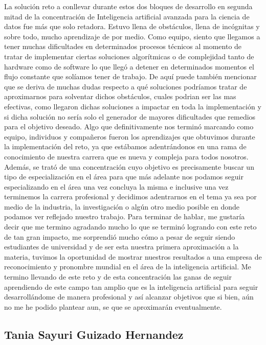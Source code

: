 \documentclass[runningheads]{llncs}
\begin{document}
La solución reto a conllevar durante estos dos bloques de desarrollo en segunda mitad de la concentración de Inteligencia artificial avanzada para la ciencia de datos fue más que solo retadora. Estuvo llena de obstáculos, llena de incógnitas y sobre todo, mucho aprendizaje de por medio. Como equipo, siento que llegamos a tener muchas dificultades en determinados procesos técnicos al momento de tratar de implementar ciertas soluciones algorítmicas o de complejidad tanto de hardware como de software lo que llegó a detener en determinados momentos el flujo constante que solíamos tener de trabajo. De aquí puede también mencionar que se deriva de muchas dudas respecto a qué soluciones podríamos tratar de aproximarnos para solventar dichos obstáculos, cuales podrian ser las mas efectivas, como llegaron dichas soluciones a impactar en toda la implementación y si dicha solución no sería solo el generador de mayores dificultades que remedios para el objetivo deseado. Algo que definitivamente nos terminó marcando como equipo, individuos y compañeros fueron los aprendizajes que obtuvimos durante la implementación del reto, ya que estábamos adentrándonos en una rama de conocimiento de nuestra carrera que es nueva y compleja para todos nosotros. Además, se trató de una concentración cuyo objetivo es precisamente buscar un tipo de especialización en el área para que más adelante nos podamos seguir especializando en el área una vez concluya la misma e inclusive una vez terminemos la carrera profesional y decidimos adentrarnos en el tema ya sea por medio de la industria, la investigación o algún otro medio posible en donde podamos ver reflejado nuestro trabajo. Para terminar de hablar, me gustaría decir que me termino agradando mucho lo que se terminó logrando con este reto de tan gran impacto, me sorprendió mucho cómo a pesar de seguir siendo estudiantes de universidad y de ser esta nuestra primera aproximación a la materia, tuvimos la oportunidad de mostrar nuestros resultados a una empresa de reconocimiento y pronombre mundial en el área de la inteligencia artificial. Me termino llevando de este reto y de esta concentración las ganas de seguir aprendiendo de este campo tan amplio que es la inteligencia artificial para seguir desarrollándome de manera profesional y así alcanzar objetivos que si bien, aún no me he podido plantear aun, se que se aproximarán eventualmente.


\subsection*{Tania Sayuri Guizado Hernandez}
\end{document}

